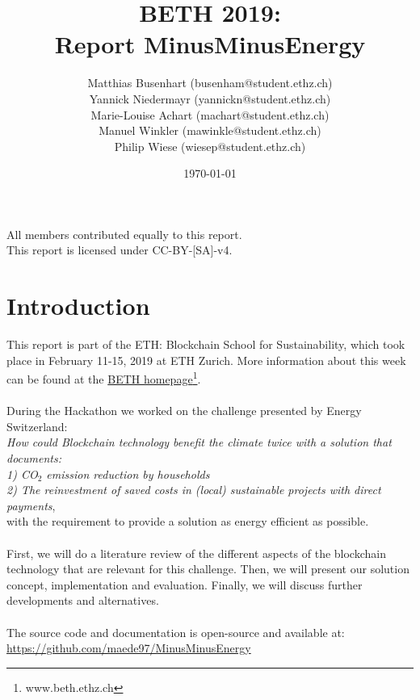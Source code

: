 \documentclass[11pt]{article}
\title{BETH 2019:\\Report MinusMinusEnergy}
\author{ Matthias Busenhart (busenham@student.ethz.ch)\\Yannick Niedermayr (yannickn@student.ethz.ch)\\ Marie-Louise Achart (machart@student.ethz.ch)\\Manuel Winkler (mawinkle@student.ethz.ch)\\Philip Wiese (wiesep@student.ethz.ch)}
\date{\today}
\begin{document}
\maketitle
\thispagestyle{empty}
\vspace{10cm}
\begin{center}
	All members contributed equally to this report.\\
	This report is licensed under CC-BY-[SA]-v4.
\end{center}

\newpage
\tableofcontents

\pagebreak
\section{Introduction}
This report is part of the ETH: Blockchain School for Sustainability, which took place in February 11-15, 2019 at ETH Zurich. More information about this week can be found at the \href{www.beth.ethz.ch}{BETH homepage}\footnote{www.beth.ethz.ch}.\\\\
During the Hackathon we worked on the challenge presented by Energy Switzerland:\\ \textit{How could Blockchain technology benefit the climate twice with a solution that documents:\\
1) CO$_2$ emission reduction by households\\
2) The reinvestment of saved costs in (local) sustainable projects with direct payments},\\
with the requirement to provide a solution as energy efficient as possible.\\\\
First, we will do a literature review of the different aspects of the blockchain technology that are relevant for this challenge. Then, we will present our solution concept, implementation and evaluation. Finally, we will discuss further developments and alternatives.\\\\
The source code and documentation is open-source and available at:\\ \href{https://github.com/maede97/MinusMinusEnergy}{https://github.com/maede97/MinusMinusEnergy}\\
\end{document}
